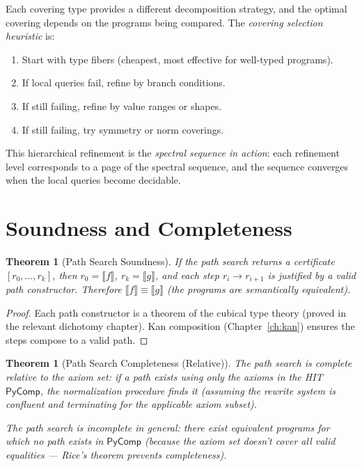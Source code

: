 \documentclass[11pt,a4paper]{report}
\theoremstyle{definition}
\theoremstyle{plain}
\newtheorem{theorem}[definition]{Theorem}
\newcommand{\den}[1]{\llbracket #1 \rrbracket}
\begin{document}
Each covering type provides a different decomposition strategy,
and the optimal covering depends on the programs being compared.
The \emph{covering selection heuristic} is:
\begin{enumerate}
  \item Start with type fibers (cheapest, most effective for
    well-typed programs).
  \item If local queries fail, refine by branch conditions.
  \item If still failing, refine by value ranges or shapes.
  \item If still failing, try symmetry or norm coverings.
\end{enumerate}

This hierarchical refinement is the \emph{spectral sequence in
action}: each refinement level corresponds to a page of the
spectral sequence, and the sequence converges when the local
queries become decidable.


\section{Soundness and Completeness}

\begin{theorem}[Path Search Soundness]
If the path search returns a certificate $[r_0, \ldots, r_k]$, then
$r_0 = \den{f}$, $r_k = \den{g}$, and each step $r_i \to r_{i+1}$
is justified by a valid path constructor.  Therefore
$\den{f} \equiv \den{g}$ (the programs are semantically equivalent).
\end{theorem}

\begin{proof}
Each path constructor is a theorem of the cubical type theory
(proved in the relevant dichotomy chapter).  Kan composition
(Chapter~\ref{ch:kan}) ensures the steps compose to a valid path.
\end{proof}

\begin{theorem}[Path Search Completeness (Relative)]
\label{thm:path-completeness}
The path search is \emph{complete relative to the axiom set}: if
a path exists using only the axioms in the HIT $\mathsf{PyComp}$,
the normalization procedure finds it (assuming the rewrite system
is confluent and terminating for the applicable axiom subset).

The path search is \emph{incomplete} in general: there exist
equivalent programs for which no path exists in $\mathsf{PyComp}$
(because the axiom set doesn't cover all valid equalities ---
Rice's theorem prevents completeness).
\end{theorem}
\end{document}

